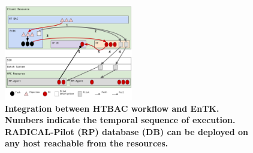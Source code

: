 \begin{figure}
\centering
  \includegraphics[width=0.5\textwidth]{FIGURES/ht-bac-rp_integration.pdf}
  \caption{\bf Integration between HTBAC workflow and EnTK\@. Numbers
  indicate the temporal sequence of execution. RADICAL-Pilot (RP) database
  (DB) can be deployed on any host reachable from the
  resources.}\label{figure:ht-bac_rp}
\end{figure}




